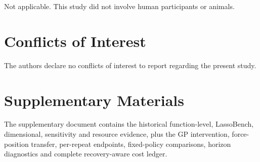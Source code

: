\documentclass[]{interact}
\begin{document}
Not applicable. This study did not involve human participants or animals.

\section*{Conflicts of Interest}

The authors declare no conflicts of interest to report regarding the present study.

\section*{Supplementary Materials}

The supplementary document contains the historical function-level, LassoBench, dimensional, sensitivity and resource evidence, plus the GP intervention, force-position transfer, per-repeat endpoints, fixed-policy comparisons, horizon diagnostics and complete recovery-aware cost ledger.


\end{document}
